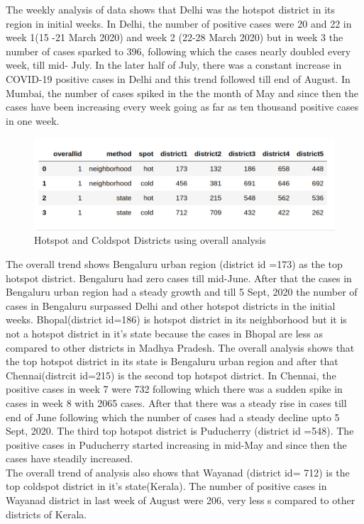 \documentclass{article}
\begin{document}
The weekly analysis of data shows that Delhi was the hotspot district in its region in initial weeks. In Delhi, the number of positive cases were 20 and 22 in week 1(15 -21 March 2020) and week 2 (22-28 March 2020) but in week 3 the number of cases sparked to 396, following which the cases nearly doubled every week, till mid- July. In the later half of July, there was a constant increase in COVID-19 positive cases in Delhi and this trend followed till end of August. In Mumbai, the number of cases spiked in the the month of May and since then the cases have been increasing every week going as far as ten thousand positive cases in one week.\\
\begin{figure}[h]
\centerline{\includegraphics[scale=0.5]{photo1.png}}
\caption{Hotspot and Coldspot Districts using overall analysis }
\label{fig}
\end{figure}
The overall trend shows Bengaluru urban region (district id =173) as the top hotspot district. Bengaluru had zero cases till mid-June. After that the cases in Bengaluru urban region had a steady growth and till 5 Sept, 2020 the number of cases in  Bengaluru surpassed Delhi and other hotspot districts in the initial weeks. Bhopal(district id=186) is hotspot district in its neighborhood but it is not a hotspot district in it's state because the cases in Bhopal are less as compared to other districts in Madhya Pradesh.
The overall analysis shows that the top hotspot district in its state is Bengaluru urban region and after that Chennai(distrcit id=215) is the second top hotspot district. In Chennai, the positive cases in week 7 were 732 following which there was a sudden spike in cases in week 8 with 2065 cases. After that there was a steady rise in cases till end of June following which the number of cases had a steady decline upto 5 Sept, 2020. The third top hotspot district is Puducherry (district id =548). The positive cases in Puducherry started increasing in mid-May and since then the cases have steadily increased.\\
The overall trend of analysis also shows that Wayanad (district id= 712) is the top coldspot district in it's state(Kerala). The number of positive cases in Wayanad district in last week of August were 206, very less s compared to other districts of Kerala.
\end{document}

